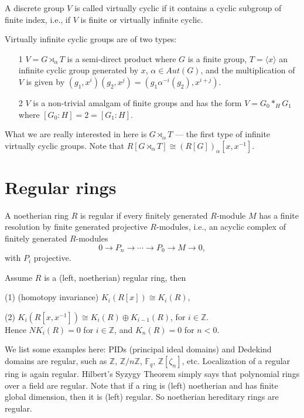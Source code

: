 \begin{definition}
A discrete group $V$ is called virtually cyclic if it contains a cyclic subgroup of finite index, i.e., if $V$ is finite or virtually infinite cyclic.
\end{definition}
Virtually infinite cyclic groups are of two types:
\begin{itemize}
 	\item[1]  $V = G \rtimes_{\alpha} T$ is a semi-direct product where $G$ is a finite group, $T = \langle x \rangle$ an infinite cyclic group generated by $x$, $\alpha \in Aut(G)$, and the multiplication of $V$ is given by $(g_1,x^i)(g_2,x^j)=(g_1\alpha^{-i}(g_2),x^{i+j})$. 
 	\item[2] $V$ is a non-trivial amalgam of finite groups and has the form $V =G_0 *_H	G_1$ where $[G_0: H ]=2=[ G_1 :H]$.
 \end{itemize}
What we are really interested in here is $G\rtimes_{\alpha} T$ --- the first type of infinite virtually cyclic groups. Note that $R[G\rtimes_{\alpha} T]\cong (R[G])_\alpha[x,x^{-1}]$.
 



\section{Regular rings}
\begin{definition}
	A noetherian ring $R$ is regular  if every finitely generated $R$-module $M$ has a finite resolution by finite generated projective $R$-modules, i.e., an acyclic complex of finitely generated $R$-modules
	\[0\longrightarrow P_n\longrightarrow \cdots \longrightarrow P_0 \longrightarrow M \longrightarrow 0, \]
	with $P_i$ projective.
\end{definition}
\begin{theorem}
	Assume $R$ is a (left, noetherian) regular ring, then 

	(1) (homotopy invariance) $K_i(R[x])\cong K_i(R)$,

	(2) $K_i(R[x,x^{-1}])\cong K_i(R)\oplus K_{i-1}(R)$, for $i \in \mathbb{Z}$.\\
	Hence $NK_i(R)=0$ for $i\in \mathbb{Z}$, and $K_n(R)=0$ for $n<0$. 
\end{theorem}
We list some examples here: PIDs (principal ideal domains) and Dedekind domains are regular, such as $\mathbb{Z}$, $\mathbb{Z}/n\mathbb{Z}$, $\mathbb{F}_q$, $\mathbb{Z}[\zeta_n]$, etc. Localization of a regular ring is again regular. Hilbert's Syzygy Theorem simply says that polynomial rings over a field are regular. Note that if a ring is (left) noetherian and has finite global dimension, then it is (left) regular. So noetherian hereditary rings are regular.

